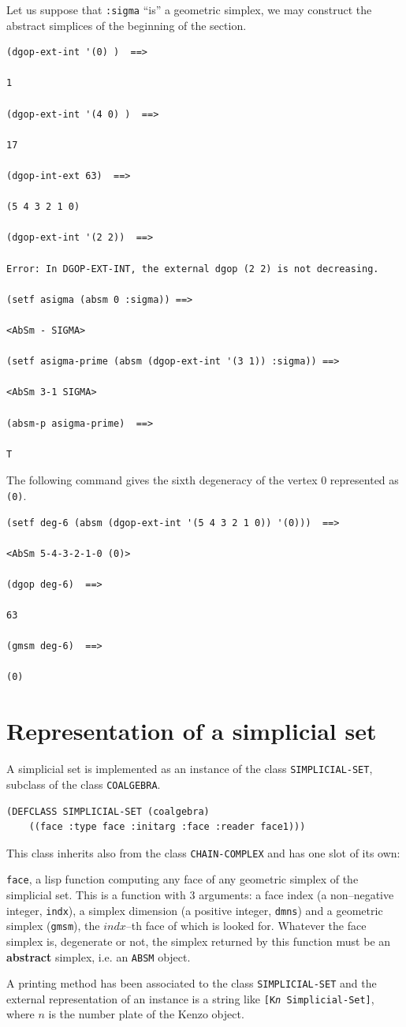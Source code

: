 Let us suppose that {\tt :sigma} ``is'' a geometric simplex,
we may construct the abstract simplices of the beginning of the section.
{\footnotesize\begin{verbatim}
(dgop-ext-int '(0) )  ==>

1

(dgop-ext-int '(4 0) )  ==>

17

(dgop-int-ext 63)  ==>

(5 4 3 2 1 0)

(dgop-ext-int '(2 2))  ==>

Error: In DGOP-EXT-INT, the external dgop (2 2) is not decreasing.

(setf asigma (absm 0 :sigma)) ==>

<AbSm - SIGMA>

(setf asigma-prime (absm (dgop-ext-int '(3 1)) :sigma)) ==>

<AbSm 3-1 SIGMA>

(absm-p asigma-prime)  ==>

T
\end{verbatim}}
The following  command gives
the sixth degeneracy of the vertex $0$ represented as {\tt (0)}.
{\footnotesize\begin{verbatim}
(setf deg-6 (absm (dgop-ext-int '(5 4 3 2 1 0)) '(0)))  ==>

<AbSm 5-4-3-2-1-0 (0)>

(dgop deg-6)  ==>

63

(gmsm deg-6)  ==>

(0)

\end{verbatim}}


\section {Representation of a simplicial set}

A simplicial set is implemented as an instance of the 
class  {\tt SIMPLICIAL-SET}, subclass of the class {\tt COALGEBRA}.
{\footnotesize\begin{verbatim}
(DEFCLASS SIMPLICIAL-SET (coalgebra)
    ((face :type face :initarg :face :reader face1)))
\end{verbatim}}
This class inherits also from the class {\tt CHAIN-COMPLEX} and has one slot of its own:
\begin{description}
\item {{\tt face}}, a lisp function  computing any face of any geometric simplex of the simplicial set.
This is a function with $3$ arguments: a face index (a non--negative integer, {\tt indx}), a simplex dimension
(a positive integer, {\tt dmns}) and a geometric simplex ({\tt gmsm}), the $indx$--th face of which
is looked for. Whatever the face simplex is, degenerate or not, the simplex returned by this function
must be an {\bf abstract} simplex, i.e. an {\tt ABSM} object.
\end{description}
A printing method has been associated to the class {\tt SIMPLICIAL-SET} 
and the external representation of  an instance is a string like {\tt [K{\em n} Simplicial-Set]}, where $n$
is the number plate of the Kenzo object. 

